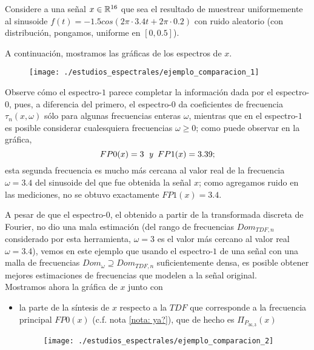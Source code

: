 \begin{ejemplo}
\label{ej: espectros comparacion}
Considere a una señal $x \in \mathbb{R}^{16}$ que sea el resultado
de muestrear uniformemente al sinusoide
$f(t) = -1.5 cos (2 \pi \cdot 3.4 t + 2 \pi \cdot 0.2)$
con ruido aleatorio (con distribución, pongamos, uniforme en $[0,0.5]$).

A continuación, mostramos las gráficas
de los espectros de $x$.


\begin{figure}[H]
\centering
    \texttt{[image: ./estudios\_espectrales/ejemplo\_comparacion\_1]}
\end{figure}


Observe cómo el espectro-$1$ parece completar la información
dada por el espectro-$0$, pues, a diferencia del primero,
el espectro-$0$
da coeficientes de frecuencia $\tau_{n}(x, \omega)$ sólo
para algunas frecuencias enteras $\omega$, mientras que en el espectro-$1$
es posible considerar cualesquiera frecuencias $\omega \geq 0$; como puede observar
en la gráfica, 
\[
FP0 (x) = 3 \hspace{0.2cm} \textit{y} \hspace{0.2cm}
FP1 (x) = 3.39;
\]
esta segunda frecuencia es mucho más cercana al valor
real de la frecuencia $\omega =3.4$ del sinusoide del que
fue obtenida la señal $x$; como agregamos ruido en las mediciones, no se
obtuvo exactamente $FP1(x) = 3.4$.

A pesar de que el espectro-$0$, el obtenido a partir de la
transformada discreta de Fourier, no dio una mala estimación (del rango
de frecuencias $Dom_{TDF,n}$ considerado por esta herramienta,
$\omega =3$ es el valor más cercano al valor real $\omega = 3.4$), vemos en este
ejemplo que usando el espectro-$1$ de una señal con una malla de
frecuencias $Dom_{\omega} \supseteq Dom_{TDF,n}$
suficientemente densa, es posible obtener mejores
estimaciones de frecuencias que modelen a la señal original. \\

Mostramos ahora la gráfica de $x$ junto con
\begin{itemize}
	\item la parte de la síntesis de $x$ respecto a la $TDF$
	que corresponde a la frecuencia principal
	$FP0(x)$ (c.f.
	nota \ref{nota: ya?}), que de hecho es
	$\Pi_{P_{36,3}}(x)$
	\begin{figure}[H]
			\centering
			\texttt{[image: ./estudios\_espectrales/ejemplo\_comparacion\_2]} 
		\end{figure}		
	

\end{itemize}
\end{ejemplo}
